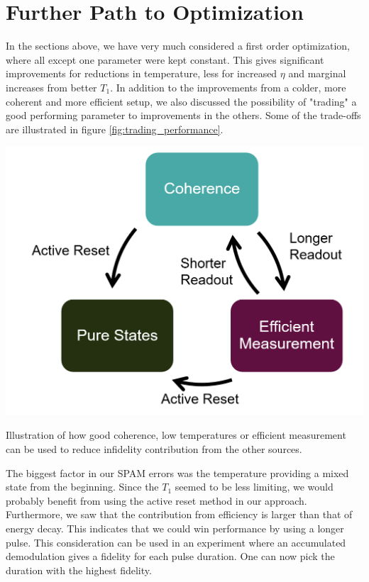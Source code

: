 \section{Further Path to Optimization}
In the sections above, we have very much considered a first order optimization, where all except one parameter were kept constant. This gives significant improvements for reductions in temperature, less for increased $\eta$ and marginal increases from better $T_1$. In addition to the improvements from a colder, more coherent and more efficient setup, we also discussed the possibility of "trading" a good performing parameter to improvements in the others. Some of the trade-offs are illustrated in figure \ref{fig:trading_performance}. 

\begin{marginfigure}
    \centering
    \includegraphics[]{Figs/trading_parameters.png}
    \caption{Illustration of how good coherence, low temperatures or efficient measurement can be used to reduce infidelity contribution from the other sources. }
    \label{fig:trading_performance}
\end{marginfigure}

The biggest factor in our SPAM errors was the temperature providing a mixed state from the beginning. Since the $T_1$ seemed to be less limiting, we would probably benefit from using the active reset method in our approach. Furthermore, we saw that the contribution from efficiency is larger than that of energy decay. This indicates that we could win performance by using a longer pulse. This consideration can be used in an experiment where an accumulated demodulation gives a fidelity for each pulse duration. One can now pick the duration with the highest fidelity.

